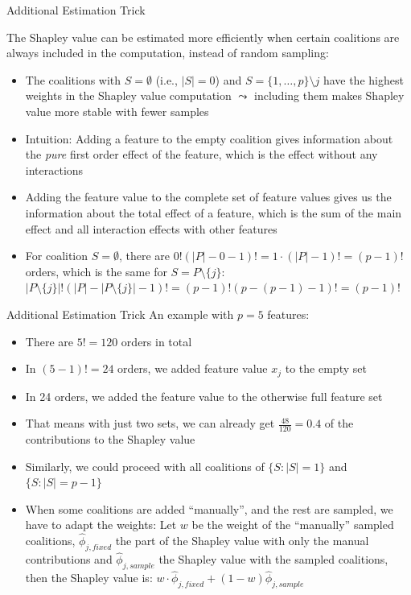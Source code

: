 \documentclass[11pt,compress,t,notes=noshow, aspectratio=169, xcolor=table]{beamer}
\begin{document}
\begin{vbframe}{Additional Estimation Trick}


  The Shapley value can be estimated more efficiently when certain coalitions are always included in the computation, instead of random sampling:
  \vspace{0.25cm}
  \begin{itemize}
  \itemsep1em
    \item The coalitions with $S = \emptyset$ (i.e., $|S| = 0$) and $S = \{1, \ldots, p\} \setminus j$ have the highest weights in the Shapley value computation $\leadsto$ including them makes Shapley value more stable with fewer samples %
    \item Intuition: Adding a feature to the empty coalition gives information about the \textit{pure} first order effect of the feature, which is the effect without any interactions 
    \item Adding the feature value to the complete set of feature values gives us the information about the total effect of a feature, which is the sum of the main effect and all interaction effects with other features
    \item For coalition $S = \emptyset$, there are $0! (|P| - 0 - 1)! = 1 \cdot (|P| - 1)! = (p - 1)!$ orders, which is the same for $S = P \setminus \{j\}$: $|P \setminus \{j\}|! (|P| - |P \setminus \{j\}| - 1)! = (p - 1)! (p - (p-1) - 1)! = (p-1)!$
\end{itemize}
 \end{vbframe}

\begin{vbframe}{Additional Estimation Trick}
An example with $p = 5$ features:
\vspace{0.25cm}
    \begin{itemize}
    \itemsep1em
        \item There are $5! = 120$ orders in total
        \item In $(5 - 1)! = 24$ orders, we added feature value $x_j$ to the empty set
        \item In 24 orders, we added the feature value to the otherwise full feature set
        \item That means with just two sets, we can already get $\frac{48}{120} = 0.4$ of the contributions to the Shapley value
        \item Similarly, we could proceed with all coalitions of $\{S: |S| = 1\}$ and $\{S: |S| = p - 1\}$
        \item When some coalitions are added \enquote{manually}, and the rest are sampled, we have to adapt the weights: Let $w$ be the weight of the \enquote{manually} sampled coalitions, $\hat{\phi}_{j,fixed}$ the part of the Shapley value with only the manual contributions and $\hat{\phi}_{j,sample}$ the Shapley value with the sampled coalitions, then the Shapley value is: $w \cdot \hat{\phi}_{j,fixed} + (1 - w) \hat{\phi}_{j,sample}$
  \end{itemize}
\end{vbframe}
\end{document}
